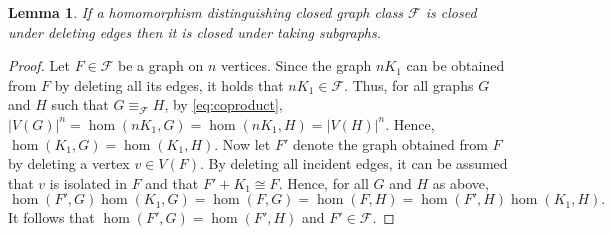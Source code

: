 \documentclass[3p,final]{elsarticle}
\newtheorem{lemma}[theorem]{Lemma}
\begin{document}
	\begin{lemma} \label{lem:minors}
		If a homomorphism distinguishing closed graph class $\mathcal{F}$ is closed under deleting edges then it is closed under taking subgraphs.
	\end{lemma}
	\begin{proof}Let $F \in \mathcal{F}$ be a graph on $n$ vertices. Since the graph $nK_1$ can be obtained from $F$ by deleting all its edges, it holds that $nK_1 \in \mathcal{F}$.
		Thus, for all graphs $G$ and $H$ such that $G \equiv_{\mathcal{F}} H$, by \cref{eq:coproduct},
		$|V(G)|^n = \hom(nK_1, G) = \hom(nK_1, H)  = |V(H)|^n$.
		Hence, $\hom(K_1, G) = \hom(K_1, H)$.
		Now let $F'$ denote the graph obtained from $F$ by deleting a vertex $v \in V(F)$.
		By deleting all incident edges, it can be assumed that $v$ is isolated in $F$ and that $F' + K_1 \cong F$. 
		Hence, for all $G$ and $H$ as above,
		\[
		\hom(F', G)\hom(K_1, G) = \hom(F, G) = \hom(F, H) = \hom(F', H)\hom(K_1, H).
		\]
		It follows that $\hom(F', G) = \hom(F', H)$ and $F' \in \mathcal{F}$.
	\end{proof}
	
	
	
	
	

	
	
\end{document}
